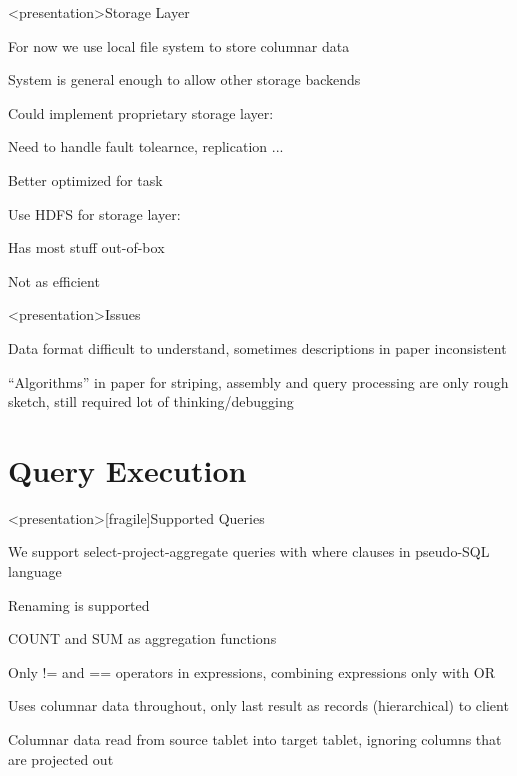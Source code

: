 \begin{frame}<presentation>{Storage Layer}
\begin{niitemize}
 \item For now we use local file system to store columnar data
 \item System is general enough to allow other storage backends
 \item Could implement proprietary storage layer:
   \begin{niitemize}
     \item Need to handle fault tolearnce, replication ...
     \item Better optimized for task
   \end{niitemize}
 \item Use HDFS for storage layer:
   \begin{niitemize}
     \item Has most stuff out-of-box
     \item Not as efficient
   \end{niitemize}
\end{niitemize}
\end{frame}

\begin{frame}<presentation>{Issues}
\begin{niitemize}
 \item Data format difficult to understand, sometimes descriptions
  in paper inconsistent
 \item ``Algorithms'' in paper for striping, assembly and query processing are only
  rough sketch, still required lot of
  thinking/debugging
\end{niitemize}
\end{frame}


\section{Query Execution}


\begin{frame}<presentation>[fragile]{Supported Queries}
\begin{niitemize}
  \item We support select-project-aggregate queries with where clauses in pseudo-SQL language
  \item Renaming is supported
  \item COUNT and SUM as aggregation functions
  \item Only != and == operators in expressions, combining expressions only with OR
  \item Uses columnar data throughout, only last result as
    records (hierarchical) to client
  \item Columnar data read from source tablet into target tablet, ignoring
    columns that are projected out
\end{niitemize}
\end{frame}

